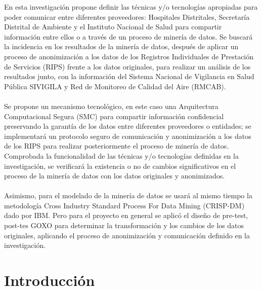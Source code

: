 \documentclass[a4paper,openright,12pt]{book}
\theoremstyle{definition}
\theoremstyle{remark}
\begin{document}
En esta investigación propone definir las técnicas y/o tecnologías apropiadas para poder comunicar entre diferentes proveedores: Hospitales Distritales, Secretaría Distrital de Ambiente y el Instituto Nacional de Salud  para compartir información entre ellos o a través de un proceso de minería de datos. Se buscará la incidencia en los resultados de la minería de datos, después de aplicar un proceso de anonimización a los datos de los Registros Individuales de Prestación de Servicios (RIPS) frente a los datos originales, para realizar un análisis de los resultados junto, con la información del Sistema Nacional de Vigilancia en Salud Pública SIVIGILA y Red de Monitoreo de Calidad del Aire (RMCAB).\\\\ Se propone un mecanismo tecnológico, en este caso una Arquitectura Computacional Segura (SMC) para compartir información confidencial preservando la garantía de los datos entre diferentes proveedores o entidades; se implementará un protocolo seguro de comunicación y anonimización a los datos de los RIPS para realizar posteriormente el proceso de minería de datos. Comprobada la funcionalidad de las técnicas y/o tecnologías definidas en la investigación, se verificará la existencia o no de cambios significativos en el proceso de la minería de datos con los datos originales y anonimizados.\\\\
Asimismo, para el modelado de la minería de datos se usará al mismo tiempo la metodología Cross Industry Standard Process For Data Mining (CRISP-DM) dado por IBM. Pero para el proyecto en general se aplicó el diseño de pre-test, post-tes GOXO para determinar la transformación y los cambios de los datos originales, aplicando el proceso de anonimización y comunicación definido en la investigación.

\tableofcontents %
\clearpage

\listoffigures %

\clearpage
{} %
\listoftables %

\chapter*{Introducción}
\end{document}
